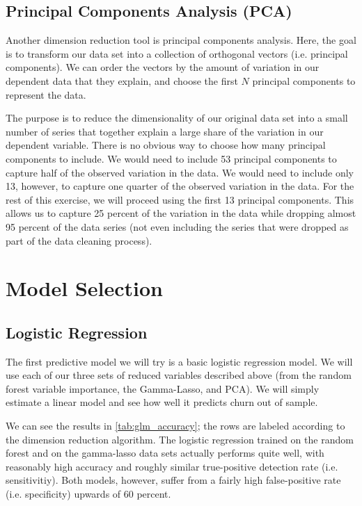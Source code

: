 \documentclass[11pt, fleqn]{article}
\begin{document}
\subsection{Principal Components Analysis (PCA)}

Another dimension reduction tool is principal components analysis. Here, the goal is to transform our data set into a collection of orthogonal vectors (i.e. principal components). We can order the vectors by the amount of variation in our dependent data that they explain, and choose the first $N$ principal components to represent the data.

The purpose is to reduce the dimensionality of our original data set into a small number of series that together explain a large share of the variation in our dependent variable. There is no obvious way to choose how many principal components to include. We would need to include 53 principal components to capture half of the observed variation in the data. We would need to include only 13, however, to capture one quarter of the observed variation in the data. For the rest of this exercise, we will proceed using the first 13 principal components. This allows us to capture 25 percent of the variation in the data while dropping almost 95 percent of the data series (not even including the series that were dropped as part of the data cleaning process). 

\section{Model Selection}

\subsection{Logistic Regression}
The first predictive model we will try is a basic logistic regression model. We will use each of our three sets of reduced variables described above (from the random forest variable importance, the Gamma-Lasso, and PCA). We will simply estimate a linear model and see how well it predicts  churn out of sample.

We can see the results in \cref{tab:glm_accuracy}; the rows are labeled according to the dimension reduction algorithm. The logistic regression trained on the random forest and on the gamma-lasso data sets actually performs quite well, with reasonably high accuracy and roughly similar true-positive detection rate (i.e. sensitivitiy). Both models, however, suffer from a fairly high false-positive rate (i.e. specificity) upwards of 60 percent.
\end{document}
